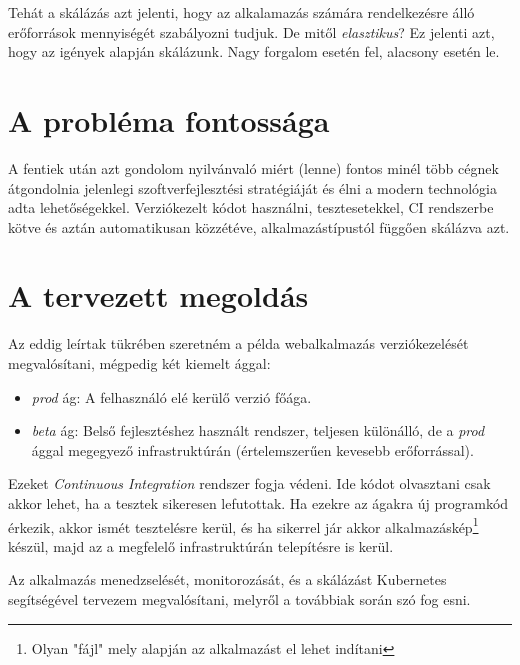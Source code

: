 Tehát a skálázás azt jelenti, hogy az alkalamazás számára rendelkezésre álló erőforrások mennyiségét szabályozni tudjuk. De mitől \textit{elasztikus}? Ez jelenti azt, hogy az igények alapján skálázunk. Nagy forgalom esetén fel, alacsony esetén le.\cite{Elastic_Turbonomic}
\section{A probléma fontossága}
A fentiek után azt gondolom nyilvánvaló miért (lenne) fontos minél több cégnek átgondolnia jelenlegi szoftverfejlesztési stratégiáját és élni a modern technológia adta lehetőségekkel. Verziókezelt kódot használni, tesztesetekkel, CI rendszerbe kötve és aztán automatikusan közzétéve, alkalmazástípustól függően skálázva azt.
\section{A tervezett megoldás}
Az eddig leírtak tükrében szeretném a példa webalkalmazás verziókezelését megvalósítani, mégpedig két kiemelt ággal:
\begin{itemize}
    \item \textit{prod} ág: A felhasználó elé kerülő verzió főága.
    \item \textit{beta} ág: Belső fejlesztéshez használt rendszer, teljesen különálló, de a \textit{prod} ággal megegyező infrastruktúrán (értelemszerűen kevesebb erőforrással).
\end{itemize}
Ezeket \textit{Continuous Integration} rendszer fogja védeni. Ide kódot olvasztani csak akkor lehet, ha a tesztek sikeresen lefutottak. Ha ezekre az ágakra új programkód érkezik, akkor ismét tesztelésre kerül, és ha sikerrel jár akkor alkalmazáskép\footnote{Olyan "fájl" mely alapján az alkalmazást el lehet indítani} készül, majd az a megfelelő infrastruktúrán telepítésre is kerül.

Az alkalmazás menedzselését, monitorozását, és a skálázást Kubernetes segítségével tervezem megvalósítani, melyről a továbbiak során szó fog esni.